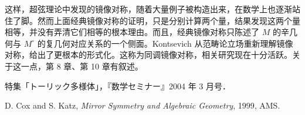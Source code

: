 这样，超弦理论中发现的镜像对称，随着大量例子被构造出来，在数学上也逐渐站住了脚。然而上面经典镜像对称的证明，只是分别计算两个量，结果发现这两个量相等，并没有弄清它们相等的根本理由。而且，经典镜像对称只陈述了 $M$ 的辛几何与 $M^\circ$ 的复几何对应关系的一个侧面。Kontsevich 从范畴论立场重新理解镜像对称，给出了更根本的形式化。这称为同调镜像对称，相关研究现在十分活跃。关于这一点，第 8 章、第 10 章有叙述。

\begin{reflist}
  \item[{[1]}] 特集「トーリック多様体」，『数学セミナー』2004 年 3 月号．
  \item[{[2]}] D. Cox and S. Katz, \textit{Mirror Symmetry and Algebraic Geometry}, 1999, AMS.
\end{reflist}

\renewcommand{\thesection}{\Roman{section}}